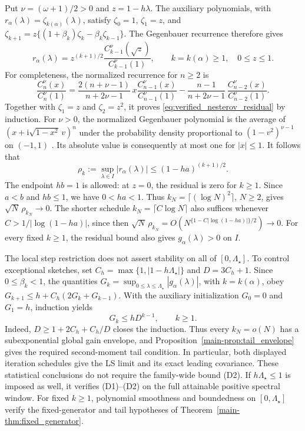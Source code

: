 \documentclass[11pt,a4paper,leqno]{article}
\numberwithin{equation}{section}
\numberwithin{figure}{section}
\numberwithin{table}{section}
\theoremstyle{plain}
\theoremstyle{definition}
\theoremstyle{remark}
\begin{document}
Put $\nu=(\omega+1)/2>0$ and $z=1-h\lambda$.
The auxiliary polynomials, with $r_\alpha(\lambda)=\zeta_{k(\alpha)}(\lambda)$, satisfy
$\zeta_0=1$, $\zeta_1=z$, and
$\zeta_{k+1}=z\{(1+\beta_k)\zeta_k-\beta_k\zeta_{k-1}\}$.
The Gegenbauer recurrence therefore gives
\begin{equation}\label{eq:verified_nesterov_residual}
 r_\alpha(\lambda)=z^{(k+1)/2}
       \frac{C_{k-1}^{\nu}(\sqrt z)}{C_{k-1}^{\nu}(1)},
 \qquad k=k(\alpha)\geq1,\quad 0\leq z\leq1.
\end{equation}
For completeness, the normalized recurrence for $n\geq2$ is
\[
 \frac{C_n^\nu(x)}{C_n^\nu(1)}
 =\frac{2(n+\nu-1)}{n+2\nu-1}\,
       x\frac{C_{n-1}^\nu(x)}{C_{n-1}^\nu(1)}
  -\frac{n-1}{n+2\nu-1}\,
       \frac{C_{n-2}^\nu(x)}{C_{n-2}^\nu(1)}.
\]
Together with $\zeta_1=z$ and $\zeta_2=z^2$, it proves
\eqref{eq:verified_nesterov_residual} by induction.
For $\nu>0$, the normalized Gegenbauer polynomial is the average of
$(x+\mathrm{i}\sqrt{1-x^2}\,v)^n$ under the probability density
proportional to $(1-v^2)^{\nu-1}$ on $(-1,1)$
\citep[Eq.~(18.10.4)]{nist2010handbook}.
Its absolute value is consequently at most one for $|x|\leq1$.
It follows that
\begin{equation*}
 \rho_k:=\sup_{\lambda\in I}|r_\alpha(\lambda)|
       \leq(1-ha)^{(k+1)/2}.
\end{equation*}
The endpoint $hb=1$ is allowed: at $z=0$, the residual is zero for $k\geq1$.
Since $a<b$ and $hb\le1$, we have $0<ha<1$.
Thus $k_N=\lceil(\log N)^2\rceil$, $N\geq2$, gives
$\sqrt N\,\rho_{k_N}\to0$.
The shorter schedule $k_N=\lceil C\log N\rceil$ also suffices whenever
$C>1/|\log(1-ha)|$, since then
$\sqrt N\,\rho_{k_N}=O(N^{\{1-C|\log(1-ha)|\}/2})\to0$.
For every fixed $k\geq1$, the residual bound also gives
$g_\alpha(\lambda)>0$ on $I$.

The local step restriction does not assert stability on all of
$[0,\Lambda_\star]$.  To control exceptional sketches, set
$C_h=\max\{1,|1-h\Lambda_\star|\}$ and $D=3C_h+1$.
Since $0\leq\beta_k<1$, the quantities
$G_k=\sup_{0\leq\lambda\leq\Lambda_\star}|g_\alpha(\lambda)|$, with $k=k(\alpha)$, obey
$G_{k+1}\leq h+C_h(2G_k+G_{k-1})$.
With the auxiliary initialization $G_0=0$ and $G_1=h$, induction yields
\begin{equation}\label{eq:verified_nesterov_global_gain}
 G_k\leq hD^{k-1},\qquad k\geq1.
\end{equation}
Indeed, $D\geq1+2C_h+C_h/D$ closes the induction.
Thus every $k_N=o(N)$ has a subexponential global gain envelope, and
Proposition~\ref{main-prop:tail_envelope} gives the required second-moment
tail condition.  In particular, both displayed iteration schedules
give the LS limit and its exact leading covariance.
These statistical conclusions do not require the family-wide bound (D2).
If $h\Lambda_\star\le1$ is imposed as well, it verifies (D1)--(D2)
on the full attainable positive spectral window.
For fixed $k\geq1$, polynomial smoothness and boundedness on
$[0,\Lambda_\star]$ verify the fixed-generator and tail hypotheses
of Theorem~\ref{main-thm:fixed_generator}.
\end{document}
